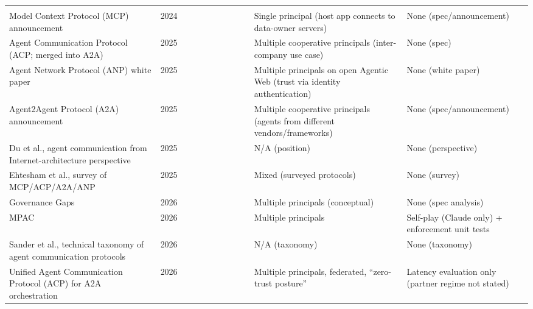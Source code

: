 \documentclass[conference]{IEEEtran}
\newcommand{\full}{{\small\CIRCLE}}
\newcommand{\half}{{\small\LEFTcircle}}
\newcommand{\none}{{\small\Circle}}
\begin{document}
{\begin{longtable}{>{\raggedright\arraybackslash}p{4.2cm} c cccccccc >{\raggedright\arraybackslash}p{3.6cm} >{\raggedright\arraybackslash}p{4.4cm}}
\multicolumn{12}{l}{\textit{Protocols}} \\
Model Context Protocol (MCP) announcement \cite{anthropic2024mcp} & 2024 & \half{} & \none{} & \none{} & \none{} & \none{} & \none{} & \none{} & \none{} & Single principal (host app connects to data-owner servers) & None (spec/announcement) \\
Agent Communication Protocol (ACP; merged into A2A) \cite{beeai2025acp} & 2025 & \half{} & \half{} & \none{} & \none{} & \none{} & \half{} & \none{} & \none{} & Multiple cooperative principals (inter-company use case) & None (spec) \\
Agent Network Protocol (ANP) white paper \cite{chang2025anp} & 2025 & \half{} & \half{} & \half{} & \none{} & \none{} & \none{} & \none{} & \none{} & Multiple principals on open Agentic Web (trust via identity authentication) & None (white paper) \\
Agent2Agent Protocol (A2A) announcement \cite{google2025a2a} & 2025 & \half{} & \half{} & \half{} & \none{} & \none{} & \half{} & \none{} & \none{} & Multiple cooperative principals (agents from different vendors/frameworks) & None (spec/announcement) \\
Du et al., agent communication from Internet-architecture perspective \cite{du2025internet} & 2025 & \half{} & \none{} & \none{} & \none{} & \none{} & \none{} & \none{} & \none{} & N/A (position) & None (perspective) \\
Ehtesham et al., survey of MCP/ACP/A2A/ANP \cite{ehtesham2025survey} & 2025 & \half{} & \half{} & \none{} & \none{} & \none{} & \none{} & \none{} & \none{} & Mixed (surveyed protocols) & None (survey) \\
Governance Gaps \cite{kang2026governance} & 2026 & \none{} & \none{} & \none{} & \none{} & \half{} & \half{} & \half{} & \none{} & Multiple principals (conceptual) & None (spec analysis) \\
MPAC \cite{qian2026mpac} & 2026 & \half{} & \half{} & \none{} & \half{} & \half{} & \full{} & \half{} & \half{} & Multiple principals & Self-play (Claude only) + enforcement unit tests \\
Sander et al., technical taxonomy of agent communication protocols \cite{sander2026taxonomy} & 2026 & \half{} & \half{} & \half{} & \none{} & \none{} & \none{} & \none{} & \none{} & N/A (taxonomy) & None (taxonomy) \\
Unified Agent Communication Protocol (ACP) for A2A orchestration \cite{krishnan2026unified} & 2026 & \half{} & \half{} & \half{} & \none{} & \none{} & \none{} & \none{} & \none{} & Multiple principals, federated, ``zero-trust posture'' & Latency evaluation only (partner regime not stated) \\

\end{longtable}}
\end{document}
